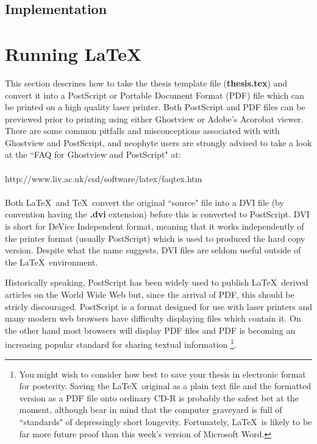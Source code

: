 \documentclass[11pt,oneside]{book}
\begin{document}
\subsection{Implementation}

\section{Running \LaTeX}
This section descrines how to take the thesis template file
({\bf thesis.tex}) and convert it into a PostScript or Portable
Document Format (PDF) file which can be printed on a high quality
laser printer. Both PostScript and PDF files can be previewed
prior to printing using either Ghostview or Adobe's Acorobat
viewer. There are some common pitfalls and misconceptions associated with
with Ghostview and PostScript, and neophyte users are strongly
advised to take a look at the ``FAQ for Ghostview and PostScript"
at:
\\
\\
http://www.liv.ac.uk/csd/software/latex/faqtex.htm
\\
\\
Both \LaTeX \ and \TeX \ convert the original ``source" file
into a DVI file (by convention having the {\bf .dvi} extension)
before this is converted to PostScript. DVI is short
for DeVice Independent format, meaning that it works
independently of the printer format (usually PostScript)
which is used to produced the hard copy version. Despite
what the name suggests, DVI files are seldom useful outside
of the \LaTeX \ environment.

Historically speaking, PostScript has been widely used to
publish \LaTeX \ derived articles
on the World Wide Web but, since the arrival of PDF, this should be
stricly discouraged. PostScript is a format designed for use with
laser printers and many modern web browsers have difficulty displaying
files which contain it. On the other hand most browsers will display
PDF files and PDF is becoming an increasing popular standard for sharing
textual information
\footnote{
You might wish to consider how best to save your thesis in electronic format
for posterity. Saving the \LaTeX \ original as a plain text file and
the formatted version as a PDF file
onto
ordinary CD-R is probably the safest bet at the moment, although bear in mind
that the computer graveyard is full of ``standards" of depressingly short longevity.
Fortunately, \LaTeX \ is likely to be far more future proof than this week's version
of Microsoft Word.
}.
\end{document}
